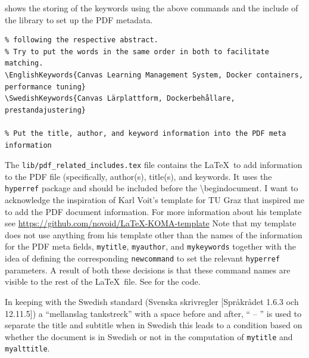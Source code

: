  shows the storing of the keywords using the above commands and the include of the library to set up the PDF metadata.
\begin{lstlisting}[language={[LaTeX]TeX}, caption={shows the storing of the keywords using the above commands and the include of the library to set up the PDF meta data}, label=lst:storingkeywords]
% Enter the English and Swedish keywords here for use in the PDF meta data _and_ for later use
% following the respective abstract.
% Try to put the words in the same order in both to facilitate matching.
\EnglishKeywords{Canvas Learning Management System, Docker containers, performance tuning}
\SwedishKeywords{Canvas Lärplattform, Dockerbehållare, prestandajustering}

% Put the title, author, and keyword information into the PDF meta information

\end{lstlisting}


The \texttt{lib/pdf\_related\_includes.tex} file contains the \LaTeX~to add information
to the PDF file (specifically, author(s), title(s), and keywords. It uses the
\texttt{hyperref} package and should be included before the \textbackslash begin{document}.
I want to acknowledge the inspiration of Karl Voit's template for TU Graz that inspired me to add the PDF document information. For more information about his template see \url{https://github.com/novoid/LaTeX-KOMA-template}
Note that my template does not use anything from his template other than the names of the information for the PDF meta fields, \ie \texttt{mytitle}, \texttt{myauthor}, and \texttt{mykeywords} together with the idea of defining the corresponding \texttt{newcommand} to set the relevant \texttt{hyperref} parameters. A result of both these decisions is that these command names are visible to the rest of the \LaTeX~file. See  for the code.

In keeping with the Swedish standard (Svenska skrivregler [Språkrådet 1.6.3 och 12.11.5]) a ``mellanslag tankstreck'' with a space before and after, \ie `` – '' is used to separate the title and subtitle when in Swedish this leads to a condition based on whether the document is in Swedish or not in the computation of \texttt{mytitle} and \texttt{myalttitle}.

